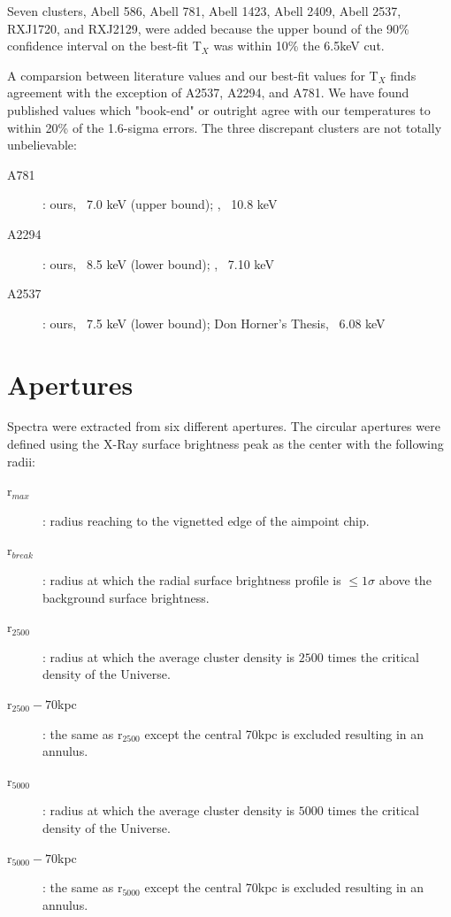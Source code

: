 \documentclass[preprint]{aastex}
\begin{document}
Seven clusters, Abell 586, Abell 781, Abell 1423, Abell 2409, Abell
2537, RXJ1720, and RXJ2129, were added because the upper bound of the
90\% confidence interval on the best-fit T$_X$ was within 10\% the 6.5keV cut.

A comparsion between literature values and our best-fit values for
T$_X$ finds agreement with the exception of A2537, A2294, and A781. We
have found published values which "book-end" or outright agree with
our temperatures to within 20\% of the 1.6-sigma errors.
The three discrepant clusters are not totally unbelievable:
\begin{description}
\item[A781]:  ours, ~7.0 keV (upper bound); \cite{2005MNRAS.359.1481B}, ~10.8 keV
\item[A2294]: ours, ~8.5 keV (lower bound); \cite{2005MNRAS.359.1481B}, ~7.10 keV
\item[A2537]: ours, ~7.5 keV (lower bound); Don Horner's Thesis, ~6.08 keV
\end{description}

\section{Apertures}

Spectra were extracted from six different apertures. The circular apertures
were defined using the X-Ray surface brightness peak as the center with
the following radii:
\begin{description}
\item[r$_{max}$]: radius reaching to the vignetted edge of the aimpoint chip.
\item[r$_{break}$]: radius at which the radial surface brightness
profile is $\le 1\sigma$ above the background surface brightness.
\item[r$_{2500}$]: radius at which the average cluster density is
$2500$ times the critical density of the Universe.
\item[r$_{2500}-70$kpc]: the same as r$_{2500}$ except the central
70kpc is excluded resulting in an annulus.
\item[r$_{5000}$]: radius at which the average cluster density is
$5000$ times the critical density of the Universe.
\item[r$_{5000}-70$kpc]: the same as r$_{5000}$ except the central
70kpc is excluded resulting in an annulus.
\end{description}
\end{document}
